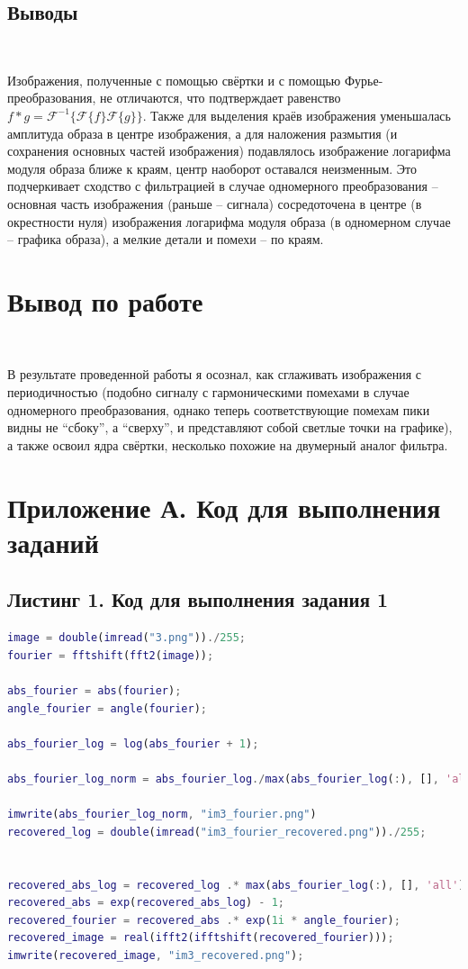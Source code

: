 \documentclass[a4paper]{article}
\begin{document}
\subsection{Выводы}\ 

Изображения, полученные с помощью свёртки и с помощью Фурье-преобразования, не отличаются, что подтверждает равенство $f * g = \mathcal{F}^{-1}\{\mathcal{F}\{f\}\mathcal{F}\{g\}\}$. Также для выделения краёв изображения уменьшалась амплитуда образа в центре изображения, а для наложения размытия (и сохранения основных частей изображения) подавлялось изображение логарифма модуля образа ближе к краям, центр наоборот оставался неизменным. Это подчеркивает сходство с фильтрацией в случае одномерного преобразования -- основная часть изображения (раньше -- сигнала) сосредоточена в центре (в окрестности нуля) изображения логарифма модуля образа (в одномерном случае -- графика образа), а мелкие детали и помехи -- по краям.

\section{Вывод по работе}\

В результате проведенной работы я осознал, как сглаживать изображения с периодичностью (подобно сигналу с гармоническими помехами в случае одномерного преобразования, однако теперь соответствующие помехам пики видны не ``сбоку'', а ``сверху'', и представляют собой светлые точки на графике), а также освоил ядра свёртки, несколько похожие на двумерный аналог фильтра.

\newpage

\section{Приложение А. Код для выполнения заданий}

\subsection*{Листинг 1. Код для выполнения задания 1}

\begin{lstlisting}[caption={Код для построения графиков для задания 1}, language=matlab]
image = double(imread("3.png"))./255;
fourier = fftshift(fft2(image));

abs_fourier = abs(fourier);
angle_fourier = angle(fourier);

abs_fourier_log = log(abs_fourier + 1);

abs_fourier_log_norm = abs_fourier_log./max(abs_fourier_log(:), [], 'all');

imwrite(abs_fourier_log_norm, "im3_fourier.png")
recovered_log = double(imread("im3_fourier_recovered.png"))./255;


recovered_abs_log = recovered_log .* max(abs_fourier_log(:), [], 'all');
recovered_abs = exp(recovered_abs_log) - 1;
recovered_fourier = recovered_abs .* exp(1i * angle_fourier);
recovered_image = real(ifft2(ifftshift(recovered_fourier)));
imwrite(recovered_image, "im3_recovered.png");
\end{lstlisting}
\end{document}
